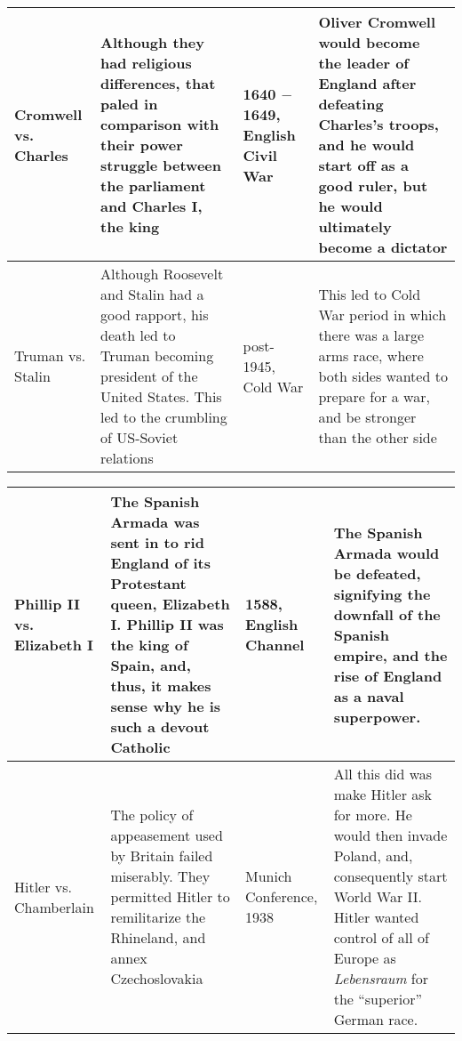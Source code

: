 \documentclass[12pt]{article}
\begin{document}
\begin{enumerate}
\begin{tabular}{|p{}|p{}|p{}|p{}|}
\hline
Cromwell vs. Charles & Although they had religious differences, that paled in comparison with their power struggle between the parliament and Charles I, the king  & 1640 $-$ 1649, English Civil War  & Oliver Cromwell would become the leader of England after defeating Charles's troops, and he would start off as a good ruler, but he would ultimately become a dictator  \\
\hline
Truman vs. Stalin & Although Roosevelt and Stalin had a good rapport, his death led to Truman becoming president of the United States. This led to the crumbling of US-Soviet relations  & post-1945, Cold War  & This led to Cold War period in which there was a large arms race, where both sides wanted to prepare for a war, and be stronger than the other side  \\
\hline
\end{tabular}
\newpage
\hspace{-25pt} \begin{tabular}{|p{}|p{}|p{}|p{}|}
\hline
Phillip II vs. Elizabeth I & The Spanish Armada was sent in to rid England of its Protestant queen, Elizabeth I. Phillip II was the king of Spain, and, thus, it makes sense why he is such a devout Catholic & 1588, English Channel & The Spanish Armada would be defeated, signifying the downfall of the Spanish empire, and the rise of England as a naval superpower.  \\
\hline
Hitler vs. Chamberlain & The policy of appeasement used by Britain failed miserably. They permitted Hitler to remilitarize the Rhineland, and annex Czechoslovakia & Munich Conference, 1938 & All this did was make Hitler ask for more. He would then invade Poland, and, consequently start World War II. Hitler wanted control of all of Europe as \textit{Lebensraum} for the ``superior'' German race.  \\
\hline


\end{tabular}

\hspace{-25pt} \begin{tabular}{|p{}|p{}|p{}|p{}|p{}|p{}|}


\end{tabular}
\end{enumerate}
\end{document}
